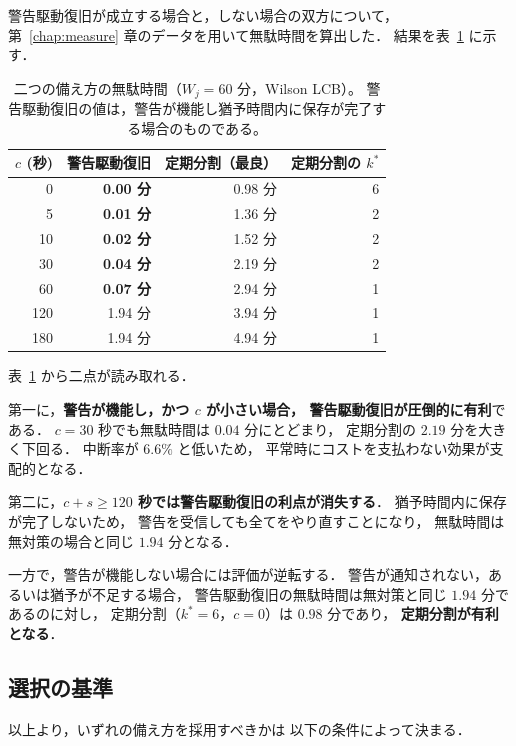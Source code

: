 \documentclass[11pt,a4paper]{ltjsreport}
\begin{document}
警告駆動復旧が成立する場合と，しない場合の双方について，
第~\ref{chap:measure} 章のデータを用いて無駄時間を算出した．
結果を表~\ref{tab:mode_compare} に示す．

\begin{table}[htbp]
\centering
\caption{二つの備え方の無駄時間（$W_j = 60$ 分，Wilson LCB）。
警告駆動復旧の値は，警告が機能し猶予時間内に保存が完了する場合のものである。}
\label{tab:mode_compare}
\small
\begin{tabular}{@{}rrrr@{}}
\toprule
$c$ (秒) & 警告駆動復旧 & 定期分割（最良） & 定期分割の $k^{*}$ \\
\midrule
0   & \textbf{0.00 分} & 0.98 分 & 6 \\
5   & \textbf{0.01 分} & 1.36 分 & 2 \\
10  & \textbf{0.02 分} & 1.52 分 & 2 \\
30  & \textbf{0.04 分} & 2.19 分 & 2 \\
60  & \textbf{0.07 分} & 2.94 分 & 1 \\
120 & 1.94 分 & 3.94 分 & 1 \\
180 & 1.94 分 & 4.94 分 & 1 \\
\bottomrule
\end{tabular}
\end{table}

表~\ref{tab:mode_compare} から二点が読み取れる．

第一に，\textbf{警告が機能し，かつ $c$ が小さい場合，
警告駆動復旧が圧倒的に有利}である．
$c = 30$ 秒でも無駄時間は $0.04$ 分にとどまり，
定期分割の $2.19$ 分を大きく下回る．
中断率が $6.6\%$ と低いため，
平常時にコストを支払わない効果が支配的となる．

第二に，\textbf{$c + s \geq 120$ 秒では警告駆動復旧の利点が消失する}．
猶予時間内に保存が完了しないため，
警告を受信しても全てをやり直すことになり，
無駄時間は無対策の場合と同じ $1.94$ 分となる．

一方で，警告が機能しない場合には評価が逆転する．
警告が通知されない，あるいは猶予が不足する場合，
警告駆動復旧の無駄時間は無対策と同じ $1.94$ 分であるのに対し，
定期分割（$k^{*}=6$，$c=0$）は $0.98$ 分であり，
\textbf{定期分割が有利となる}．

\subsection{選択の基準}
\label{sec:warning_cond}

以上より，いずれの備え方を採用すべきかは
以下の条件によって決まる．
\end{document}
